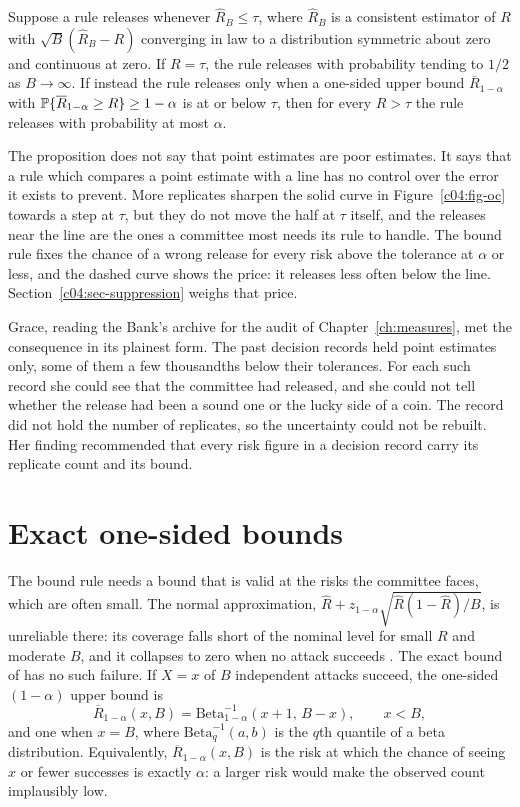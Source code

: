\begin{proposition}\label{c04:prop-point}
Suppose a rule releases whenever $\widehat{R}_B \le \tau$, where $\widehat{R}_B$ is
a consistent estimator of $R$ with $\sqrt{B}(\widehat{R}_B - R)$ converging in law to
a distribution symmetric about zero and continuous at zero. If $R = \tau$, the rule
releases with probability tending to $1/2$ as $B \to \infty$. If instead the rule
releases only when a one-sided upper bound $\overline{R}_{1-\alpha}$ with
$\mathbb{P}\{\overline{R}_{1-\alpha} \ge R\} \ge 1-\alpha$ is at or below $\tau$, then for
every $R > \tau$ the rule releases with probability at most $\alpha$.
\end{proposition}

The proposition does not say that point estimates are poor estimates. It says that a
rule which compares a point estimate with a line has no control over the error it
exists to prevent. More replicates sharpen the solid curve in Figure~\ref{c04:fig-oc}
towards a step at $\tau$, but they do not move the half at $\tau$ itself, and the
releases near the line are the ones a committee most needs its rule to handle. The
bound rule fixes the chance of a wrong release for every risk above the tolerance at
$\alpha$ or less, and the dashed curve shows the price: it releases less often below
the line. Section~\ref{c04:sec-suppression} weighs that price.

Grace, reading the Bank's archive for the audit of Chapter~\ref{ch:measures}, met the
consequence in its plainest form. The past decision records held point estimates only,
some of them a few thousandths below their tolerances. For each such record she could
see that the committee had released, and she could not tell whether the release had been
a sound one or the lucky side of a coin. The record did not hold the number of
replicates, so the uncertainty could not be rebuilt. Her finding recommended that every
risk figure in a decision record carry its replicate count and its bound.

\section{Exact one-sided bounds}

The bound rule needs a bound that is valid at the risks the committee faces, which are often
small. The normal approximation, $\widehat{R} + z_{1-\alpha}\sqrt{\widehat{R}(1-\widehat{R})/B}$,
is unreliable there: its coverage falls short of the nominal level for small $R$ and
moderate $B$, and it collapses to zero when no attack succeeds \citep{brown2001}. The
exact bound of \citet{clopper1934} has no such failure. If $X = x$ of $B$ independent
attacks succeed, the one-sided $(1-\alpha)$ upper bound is
\begin{equation}\label{c04:eq-cp}
\overline{R}_{1-\alpha}(x,B) = \mathrm{Beta}^{-1}_{1-\alpha}(x+1,\,B-x), \qquad x < B,
\end{equation}
and one when $x = B$, where $\mathrm{Beta}^{-1}_{q}(a,b)$ is the $q$th quantile of a
beta distribution. Equivalently, $\overline{R}_{1-\alpha}(x,B)$ is the risk at which the
chance of seeing $x$ or fewer successes is exactly $\alpha$: a larger risk would make the
observed count implausibly low.

